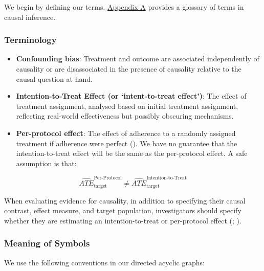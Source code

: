 \documentclass[
  single column]{article}
\begin{document}
We begin by defining our terms. \hyperref[id-app-a]{Appendix A} provides
a glossary of terms in causal inference.

\subsubsection{Terminology}\label{terminology}

\begin{itemize}
\item
  \textbf{Confounding bias}: Treatment and outcome are associated
  independently of causality or are disassociated in the presence of
  causality relative to the causal question at hand.
\item
  \textbf{Intention-to-Treat Effect (or `intent-to-treat effect')}: The
  effect of treatment assignment, analysed based on initial treatment
  assignment, reflecting real-world effectiveness but possibly obscuring
  mechanisms.
\item
  \textbf{Per-protocol effect}: The effect of adherence to a randomly
  assigned treatment if adherence were perfect
  (). We have no
  guarantee that the intention-to-treat effect will be the same as the
  per-protocol effect. A safe assumption is that:
\end{itemize}

\[
\widehat{ATE}_{\text{target}}^{\text{Per-Protocol}} \ne \widehat{ATE}_{\text{target}}^{\text{Intention-to-Treat}}
\]

When evaluating evidence for causality, in addition to specifying their
causal contrast, effect measure, and target population, investigators
should specify whether they are estimating an intention-to-treat or
per-protocol effect (;
).

\subsubsection{Meaning of Symbols}\label{meaning-of-symbols}

We use the following conventions in our directed acyclic graphs:
\end{document}
